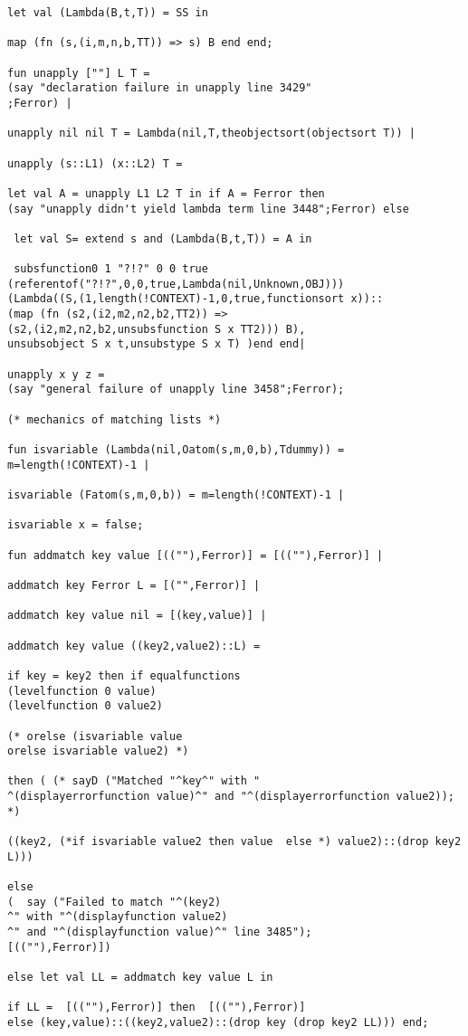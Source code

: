 \documentclass[12pt]{article}
\begin{document}
\begin{verbatim}
let val (Lambda(B,t,T)) = SS in

map (fn (s,(i,m,n,b,TT)) => s) B end end;

fun unapply [""] L T = 
(say "declaration failure in unapply line 3429"
;Ferror) |

unapply nil nil T = Lambda(nil,T,theobjectsort(objectsort T)) |

unapply (s::L1) (x::L2) T = 

let val A = unapply L1 L2 T in if A = Ferror then 
(say "unapply didn't yield lambda term line 3448";Ferror) else 

 let val S= extend s and (Lambda(B,t,T)) = A in

 subsfunction0 1 "?!?" 0 0 true 
(referentof("?!?",0,0,true,Lambda(nil,Unknown,OBJ))) 
(Lambda((S,(1,length(!CONTEXT)-1,0,true,functionsort x))::
(map (fn (s2,(i2,m2,n2,b2,TT2)) => 
(s2,(i2,m2,n2,b2,unsubsfunction S x TT2))) B),
unsubsobject S x t,unsubstype S x T) )end end|

unapply x y z = 
(say "general failure of unapply line 3458";Ferror);

(* mechanics of matching lists *)

fun isvariable (Lambda(nil,Oatom(s,m,0,b),Tdummy)) = m=length(!CONTEXT)-1 |

isvariable (Fatom(s,m,0,b)) = m=length(!CONTEXT)-1 |

isvariable x = false;

fun addmatch key value [((""),Ferror)] = [((""),Ferror)] |

addmatch key Ferror L = [("",Ferror)] |

addmatch key value nil = [(key,value)] |

addmatch key value ((key2,value2)::L) =

if key = key2 then if equalfunctions 
(levelfunction 0 value) 
(levelfunction 0 value2) 

(* orelse (isvariable value
orelse isvariable value2) *)

then ( (* sayD ("Matched "^key^" with "
^(displayerrorfunction value)^" and "^(displayerrorfunction value2)); *)

((key2, (*if isvariable value2 then value  else *) value2)::(drop key2 L)))

else  
(  say ("Failed to match "^(key2)
^" with "^(displayfunction value2)
^" and "^(displayfunction value)^" line 3485"); 
[((""),Ferror)])

else let val LL = addmatch key value L in

if LL =  [((""),Ferror)] then  [((""),Ferror)]
else (key,value)::((key2,value2)::(drop key (drop key2 LL))) end;


\end{verbatim}
\end{document}
